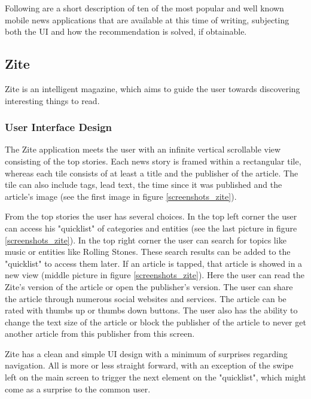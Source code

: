Following are a short description of ten of the most popular and well known mobile news applications that are available at this time of writing, subjecting both the UI and how the recommendation is solved, if obtainable.

\subsection{Zite}
Zite is an intelligent magazine, which aims to guide the user towards discovering interesting things to read\cite{zite_appstore}.

\subsubsection{User Interface Design}
The Zite application meets the user with an infinite vertical scrollable view consisting of the top stories. Each news story is framed within a rectangular tile, whereas each tile consists of at least a title and the publisher of the article. The tile can also include tags, lead text, the time since it was published and the article's image (see the first image in figure \ref{screenshots_zite}).

From the top stories the user has several choices. In the top left corner the user can access his "quicklist" of categories and entities (see the last picture in figure \ref{screenshots_zite}). In the top right corner the user can search for topics like music or entities like Rolling Stones. These search results can be added to the "quicklist" to access them later. If an article is tapped, that article is showed in a new view (middle picture in figure \ref{screenshots_zite}). Here the user can read the Zite's version of the article or open the publisher's version. The user can share the article through numerous social websites and services. The article can be rated with thumbs up or thumbs down buttons. The user also has the ability to change the text size of the article or block the publisher of the article to never get another article from this publisher from this screen.

Zite has a clean and simple UI design with a minimum of surprises regarding navigation. All is more or less straight forward, with an exception of the swipe left on the main screen to trigger the next element on the "quicklist", which might come as a surprise to the common user.

